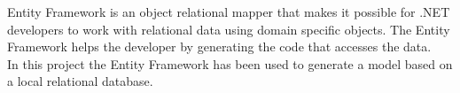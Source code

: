 Entity Framework is an object relational mapper that makes it possible for .NET developers to work with relational data using domain specific objects.
The Entity Framework helps the developer by generating the code that accesses the data.
\cite{entity_framework}
\\
In this project the Entity Framework has been used to generate a model based on a local relational database.